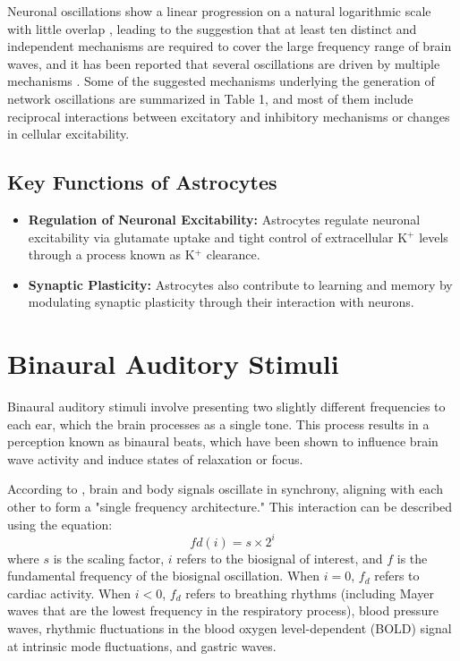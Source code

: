 \documentclass{article}
\begin{document}
Neuronal oscillations show a linear progression on a natural logarithmic scale with little overlap \citep{Penttonen2003}, leading to the suggestion that at least ten distinct and independent mechanisms are required to cover the large frequency range of brain waves, and it has been reported that several oscillations are driven by multiple mechanisms \citep{Buzsaki2009,BuzsakiDraguhn2004}. Some of the suggested mechanisms underlying the generation of network oscillations are summarized in Table 1, and most of them include reciprocal interactions between excitatory and inhibitory mechanisms or changes in cellular excitability.


\subsection{Key Functions of Astrocytes}
\begin{itemize}
    \item \textbf{Regulation of Neuronal Excitability:} Astrocytes regulate neuronal excitability via glutamate uptake and tight control of extracellular K\(^+\) levels through a process known as K\(^+\) clearance.
    \item \textbf{Synaptic Plasticity:} Astrocytes also contribute to learning and memory by modulating synaptic plasticity through their interaction with neurons.
\end{itemize}

\section{Binaural Auditory Stimuli}
Binaural auditory stimuli involve presenting two slightly different frequencies to each ear, which the brain processes as a single tone. This process results in a perception known as binaural beats, which have been shown to influence brain wave activity and induce states of relaxation or focus.

According to \citep{klimesch2013}, brain and body signals oscillate in synchrony, aligning with each other to form a "single frequency architecture." This interaction can be described using the equation:
\[
fd(i) = s \times 2^i
\]
where $s$ is the scaling factor, $i$ refers to the biosignal of interest, and $f$ is the fundamental frequency of the biosignal oscillation. When $i = 0$, $f_d$ refers to cardiac activity. When $i < 0$, $f_d$ refers to breathing rhythms (including Mayer waves that are the lowest frequency in the respiratory process), blood pressure waves, rhythmic fluctuations in the blood oxygen level-dependent (BOLD) signal at intrinsic mode fluctuations, and gastric waves. 
\end{document}
